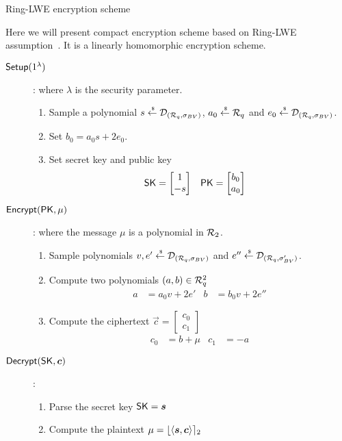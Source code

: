 \begin{subsection}{Ring-LWE encryption scheme~\cite{DBLP:conf/eurocrypt/LyubashevskyPR13}}

  Here we will present compact encryption scheme based on Ring-LWE assumption~\cite{DBLP:conf/eurocrypt/LyubashevskyPR13}.
  It is a linearly homomorphic encryption scheme.
  
  \begin{description}
  \item[${\mathsf{Setup}}(1^\lambda)$]: where $\lambda$ is the security parameter.
    \begin{enumerate}
    \item Sample a polynomial $s \stackrel{{\scriptscriptstyle \mkern4mu \$}}{\gets} \mathcal{D}_{({\mathcal{R}}_q, \sigma_{BV})}$, $a_0 \stackrel{{\scriptscriptstyle \mkern4mu \$}}{\gets} {\mathcal{R}}_q$ and $e_0 \stackrel{{\scriptscriptstyle \mkern4mu \$}}{\gets} \mathcal{D}_{({\mathcal{R}}_q, \sigma_{BV})}$.
    \item Set $b_0 = a_0 s + 2 e_0$.
    \item Set secret key and public key
      \begin{align*}
        \mathsf{SK} &= \begin{bmatrix} 1 \\ -s\end{bmatrix} & \mathsf{PK} &= \begin{bmatrix} b_0 \\ a_0\end{bmatrix}
      \end{align*}
    \end{enumerate}
  \item[${\mathsf{Encrypt}}(\mathsf{PK}, \mu)$]: where the message $\mu$ is a polynomial in ${\mathcal{R}}_2$.
    \begin{enumerate}
    \item Sample polynomials $v,e' \stackrel{{\scriptscriptstyle \mkern4mu \$}}{\gets} \mathcal{D}_{({\mathcal{R}}_q, \sigma_{BV})}$ and $e'' \stackrel{{\scriptscriptstyle \mkern4mu \$}}{\gets}  \mathcal{D}_{({\mathcal{R}}_q, \sigma_{BV}')}$.
    \item Compute two polynomials $(a, b) \in {\mathcal{R}}_q^2$
      \begin{align*}
        a &= a_0 v + 2 e' & b &= b_0 v +2 e'' 
      \end{align*}
    \item Compute the ciphertext $\vec{c} = \begin{bmatrix} c_0 \\ c_1\end{bmatrix}$
      \begin{align*}
        c_0 &= b + \mu & c_1 &= -a
      \end{align*}
    \end{enumerate}
  \item[$\Dec(\SK, \vec{c})$]:
    \begin{enumerate}
    \item Parse the secret key $\SK = \vec{s}$
    \item Compute the plaintext $\mu = \round{\langle \vec{s}, \vec{c}\rangle}_2$
    \end{enumerate}
  \end{description}
\end{subsection}




